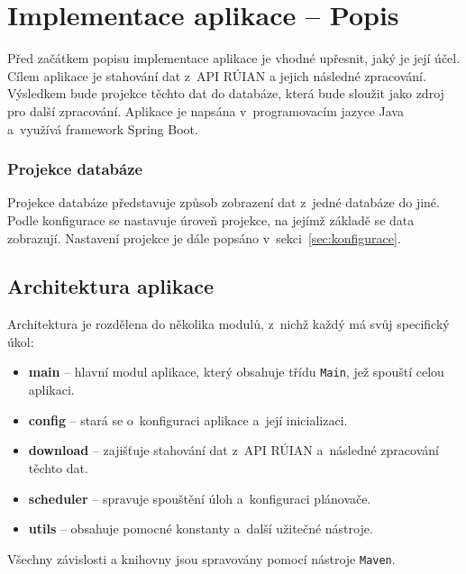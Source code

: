 \section{Implementace aplikace -- Popis}
Před začátkem popisu implementace aplikace je vhodné upřesnit, jaký je její účel.  
Cílem aplikace je stahování dat z~API RÚIAN a jejich následné zpracování.  
Výsledkem bude projekce těchto dat do databáze, která bude sloužit jako zdroj pro další zpracování.  
Aplikace je napsána v~programovacím jazyce Java a~využívá framework Spring Boot.

\subsubsection*{Projekce databáze}
Projekce databáze představuje způsob zobrazení dat z~jedné databáze do jiné.  
Podle konfigurace se nastavuje úroveň projekce, na jejímž základě se data zobrazují.  
Nastavení projekce je dále popsáno v~sekci~\ref{sec:konfigurace}.

\subsection{Architektura aplikace}
Architektura je rozdělena do několika modulů, z~nichž každý má svůj specifický úkol:
\begin{itemize}[itemsep=0pt]
    \item \textbf{main} -- hlavní modul aplikace, který obsahuje třídu \texttt{Main}, jež spouští celou aplikaci.
    \item \textbf{config} -- stará se o~konfiguraci aplikace a~její inicializaci.
    \item \textbf{download} -- zajišťuje stahování dat z~API RÚIAN a~následné zpracování těchto dat.
    \item \textbf{scheduler} -- spravuje spouštění úloh a~konfiguraci plánovače.
    \item \textbf{utils} -- obsahuje pomocné konstanty a~další užitečné nástroje.
\end{itemize}
Všechny závislosti a knihovny jsou spravovány pomocí nástroje \texttt{Maven}.

\newpage